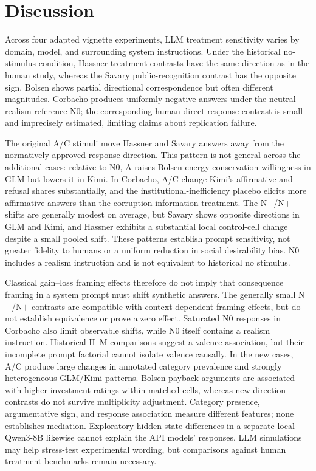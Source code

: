 \section{Discussion}

Across four adapted vignette experiments, LLM treatment sensitivity varies by domain, model, and surrounding system instructions. Under the historical no-stimulus condition, Hassner treatment contrasts have the same direction as in the human study, whereas the Savary public-recognition contrast has the opposite sign. Bolsen shows partial directional correspondence but often different magnitudes. Corbacho produces uniformly negative answers under the neutral-realism reference N0; the corresponding human direct-response contrast is small and imprecisely estimated, limiting claims about replication failure.

The original A/C stimuli move Hassner and Savary answers away from the normatively approved response direction. This pattern is not general across the additional cases: relative to N0, A raises Bolsen energy-conservation willingness in GLM but lowers it in Kimi. In Corbacho, A/C change Kimi's affirmative and refusal shares substantially, and the institutional-inefficiency placebo elicits more affirmative answers than the corruption-information treatment. The N$-$/N$+$ shifts are generally modest on average, but Savary shows opposite directions in GLM and Kimi, and Hassner exhibits a substantial local control-cell change despite a small pooled shift. These patterns establish prompt sensitivity, not greater fidelity to humans or a uniform reduction in social desirability bias. N0 includes a realism instruction and is not equivalent to historical no stimulus.

Classical gain--loss framing effects therefore do not imply that consequence framing in a system prompt must shift synthetic answers. The generally small N$-$/N$+$ contrasts are compatible with context-dependent framing effects, but do not establish equivalence or prove a zero effect. Saturated N0 responses in Corbacho also limit observable shifts, while N0 itself contains a realism instruction. Historical H--M comparisons suggest a valence association, but their incomplete prompt factorial cannot isolate valence causally. In the new cases, A/C produce large changes in annotated category prevalence and strongly heterogeneous GLM/Kimi patterns. Bolsen payback arguments are associated with higher investment ratings within matched cells, whereas new direction contrasts do not survive multiplicity adjustment. Category presence, argumentative sign, and response association measure different features; none establishes mediation. Exploratory hidden-state differences in a separate local Qwen3-8B likewise cannot explain the API models' responses. LLM simulations may help stress-test experimental wording, but comparisons against human treatment benchmarks remain necessary.


